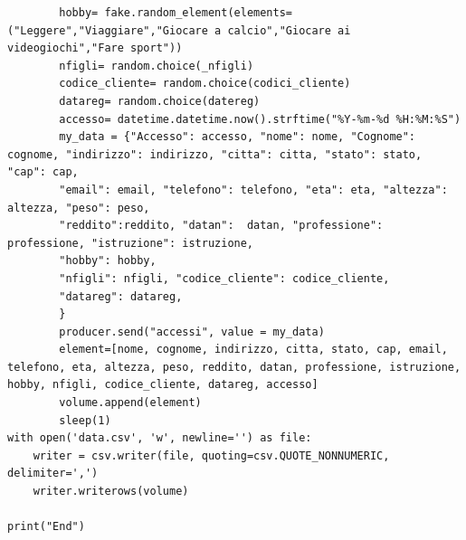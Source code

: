 \documentclass{article}
\begin{document}
\begin{lstlisting}
        hobby= fake.random_element(elements=("Leggere","Viaggiare","Giocare a calcio","Giocare ai videogiochi","Fare sport"))
        nfigli= random.choice(_nfigli)
        codice_cliente= random.choice(codici_cliente)
        datareg= random.choice(datereg)
        accesso= datetime.datetime.now().strftime("%Y-%m-%d %H:%M:%S")
        my_data = {"Accesso": accesso, "nome": nome, "Cognome": cognome, "indirizzo": indirizzo, "citta": citta, "stato": stato, "cap": cap,
        "email": email, "telefono": telefono, "eta": eta, "altezza": altezza, "peso": peso,
        "reddito":reddito, "datan":  datan, "professione":  professione, "istruzione": istruzione,
        "hobby": hobby,
        "nfigli": nfigli, "codice_cliente": codice_cliente, 
        "datareg": datareg, 
        }
        producer.send("accessi", value = my_data) 
        element=[nome, cognome, indirizzo, citta, stato, cap, email, telefono, eta, altezza, peso, reddito, datan, professione, istruzione, hobby, nfigli, codice_cliente, datareg, accesso]
        volume.append(element)
        sleep(1)
with open('data.csv', 'w', newline='') as file:
    writer = csv.writer(file, quoting=csv.QUOTE_NONNUMERIC, delimiter=',')
    writer.writerows(volume) 

print("End")
     

\end{lstlisting}
\end{document}
